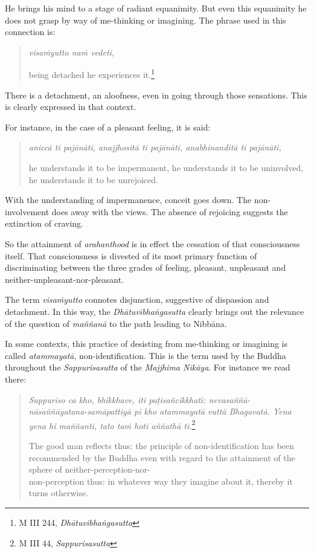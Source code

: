 He brings his mind to a stage of radiant equanimity. But even this equanimity he does not grasp by way of me-thinking or imagining. The phrase used in this connection is:

\begin{quote}
\emph{visaṁyutto naṁ vedeti,}

being detached he experiences it.\footnote{M III 244, \emph{Dhātuvibhaṅgasutta}}
\end{quote}

There is a detachment, an aloofness, even in going through those sensations. This is clearly expressed in that context.

For instance, in the case of a pleasant feeling, it is said:

\begin{quote}
\emph{aniccā ti pajānāti, anajjhositā ti pajānāti, anabhinanditā ti pajānāti,}

he understands it to be impermanent, he understands it to be uninvolved, he understands it to be unrejoiced.
\end{quote}

With the understanding of impermanence, conceit goes down. The non-involvement does away with the views. The absence of rejoicing suggests the extinction of craving.

So the attainment of \emph{arahanthood} is in effect the cessation of that consciousness itself. That consciousness is divested of its most primary function of discriminating between the three grades of feeling, pleasant, unpleasant and neither-unpleasant-nor-pleasant.

The term \emph{visaṁyutto} connotes disjunction, suggestive of dispassion and detachment. In this way, the \emph{Dhātuvibhaṅgasutta} clearly brings out the relevance of the question of \emph{maññanā} to the path leading to Nibbāna.

In some contexts, this practice of desisting from me-thinking or imagining is called \emph{atammayatā}, non-identification. This is the term used by the Buddha throughout the \emph{Sappurisasutta} of the \emph{Majjhima Nikāya}. For instance we read there:

\begin{quote}
\emph{Sappuriso ca kho, bhikkhave, iti paṭisañcikkhati: nevasaññā-\\ nāsaññāyatana-samāpattiyā pi kho atammayatā vuttā Bhagavatā. Yena yena hi maññanti, tato taṁ hoti aññathā ti.}\footnote{M III 44, \emph{Sappurisasutta}}

The good man reflects thus: the principle of non-identification has been recommended by the Buddha even with regard to the attainment of the sphere of neither-perception-nor-\\ non-perception thus: in whatever way they imagine about it, thereby it turns otherwise.
\end{quote}

